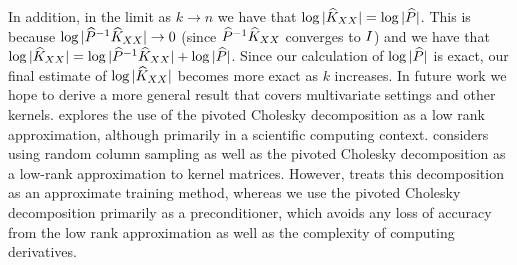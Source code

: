 In addition, in the limit as $k \rightarrow n$ we have that $\log \vert \widehat{K}_{XX} \vert = \log \vert \widehat{P} \vert$.
This is because $\log \vert \widehat{P}^{-1}\widehat{K}_{XX} \vert \rightarrow 0$ (since $\widehat{P}^{-1}\widehat{K}_{XX}$ converges to $I$) and we have that $\log \vert \widehat{K}_{XX} \vert = \log \vert \widehat{P}^{-1}\widehat{K}_{XX} \vert + \log \vert \widehat{P} \vert$.
Since our calculation of $\log \vert \widehat{P} \vert$ is exact, our final estimate of $\log \vert \widehat{K}_{XX} \vert$ becomes more exact as $k$ increases.
In future work we hope to derive a more general result that covers multivariate settings and other kernels.
%
\citet{harbrecht2012low} explores the use of the pivoted Cholesky decomposition as a low rank approximation, although primarily in a scientific computing context.
\citet{bach2013sharp} considers using random column sampling as well as the pivoted Cholesky decomposition as a low-rank approximation to kernel matrices.
However, \citet{bach2013sharp} treats this decomposition as an approximate training method, whereas we use the pivoted Cholesky decomposition primarily
as a preconditioner, which avoids any loss of accuracy from the low rank approximation as well as the complexity of computing derivatives.


